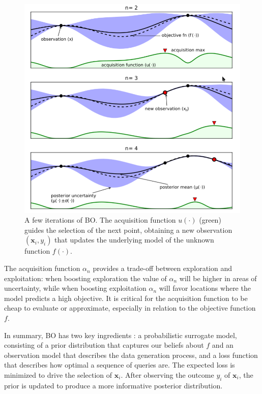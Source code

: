 \documentclass[a4paper, 12pt]{article} %
\begin{document}
	\begin{figure}
		\includegraphics[width=\linewidth]{img/bo.png}
		\caption{A few iterations of BO. The acquisition function $u(\cdot)$ (green) guides the selection of the next point, obtaining a new observation $(\pmb{x}_i, y_i)$ that updates the underlying model of the unknown function $f(\cdot)$.} 
		\label{fig:bo}
	\end{figure}
	The acquisition function $\alpha_n$ provides a trade-off between exploration and exploitation: when boosting exploration the value of $\alpha_n$ will be higher in areas of uncertainty, while when boosting exploitation $\alpha_n$ will favor locations where the model predicts a high objective. It is critical for the acquisition function to be cheap to evaluate or approximate, especially in relation to the objective function $f$.
	
	In summary, BO has two key ingredients \cite{BO}: a probabilistic surrogate model, consisting of a prior distribution that captures our beliefs about $f$ and an observation model that describes the data generation process, and a loss function that describes how optimal a sequence of queries are. The expected loss is minimized to drive the selection of $\pmb{x}_i$. After observing the outcome $y_i$ of $\pmb{x}_i$, the prior is updated to produce a more informative posterior distribution.
	
\end{document}
